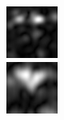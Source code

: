 \begin{figure}[ht]
\begin{center}
 \includegraphics[width=\columnwidth/9]{ch4/figures/mag_0_7.jpg}\\
 \includegraphics[width=\columnwidth/9]{ch4/figures/mag_1_0.jpg}

\end{center}
\end{figure}
